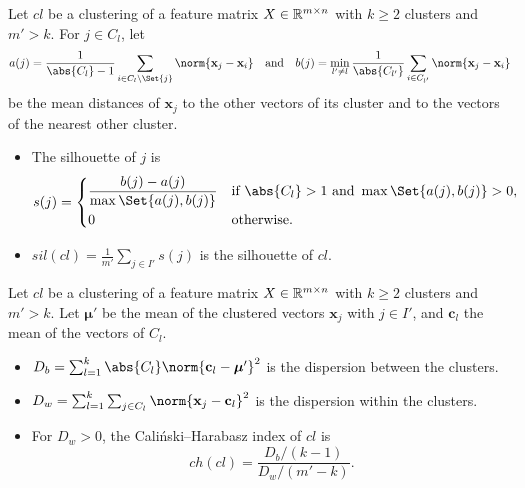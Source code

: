 \begin{definition}[Silhouette]
	\label{def:prelim:silhouette}
	Let $\mathit{cl}$ be a clustering of a feature matrix $X \in \mathbb R^{m \times n}$ with $k \ge 2$ clusters and $m' > k$. For $j \in C_l$, let
	\[
		a(j) = \frac{1}{\abs{C_l} - 1} \sum_{i \in C_l \setminus \Set{j}} \norm{\mathbf{x}_j - \mathbf{x}_i}
		\quad\text{and}\quad
		b(j) = \min_{l' \neq l} \frac{1}{\abs{C_{l'}}} \sum_{i \in C_{l'}} \norm{\mathbf{x}_j - \mathbf{x}_i}
	\]
	be the mean distances of $\mathbf{x}_j$ to the other vectors of its cluster and to the vectors of the nearest other cluster.
	\begin{itemize}
		\item The silhouette of $j$ is
		      \[
			      s(j) =
			      \begin{cases}
				      \dfrac{b(j) - a(j)}{\max\Set{a(j), b(j)}} & \text{if } \abs{C_l} > 1 \text{ and } \max\Set{a(j), b(j)} > 0, \\[1.5ex]
				      0                                          & \text{otherwise}.
			      \end{cases}
		      \]
		\item $\mathit{sil}(\mathit{cl}) = \frac{1}{m'} \sum_{j \in I'} s(j)$ is the silhouette of $\mathit{cl}$.
	\end{itemize}
\end{definition}

\begin{definition}
	\label{def:prelim:ch}
	Let $\mathit{cl}$ be a clustering of a feature matrix $X \in \mathbb R^{m \times n}$ with $k \ge 2$ clusters and $m' > k$. Let $\boldsymbol{\mu}'$ be the mean of the clustered vectors $\mathbf{x}_j$ with $j \in I'$, and $\mathbf{c}_l$ the mean of the vectors of $C_l$.
	\begin{itemize}
		\item $D_b = \sum_{l=1}^{k} \abs{C_l} \norm{\mathbf{c}_l - \boldsymbol{\mu}'}^2$ is the dispersion between the clusters.
		\item $D_w = \sum_{l=1}^{k} \sum_{j \in C_l} \norm{\mathbf{x}_j - \mathbf{c}_l}^2$ is the dispersion within the clusters.
		\item For $D_w > 0$, the Cali\'nski--Harabasz index of $\mathit{cl}$ is
		      \[
			      \mathit{ch}(\mathit{cl}) = \frac{D_b / (k - 1)}{D_w / (m' - k)}.
		      \]
	\end{itemize}
\end{definition}


